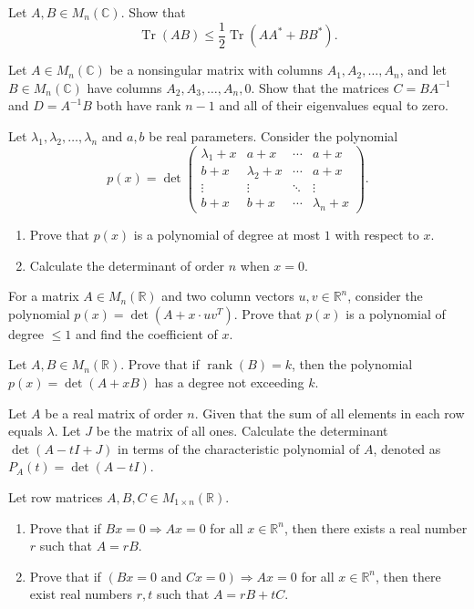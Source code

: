 \documentclass[12pt]{article}
\begin{document}
\begin{problems}
\item Let $A, B \in M_n(\mathbb{C})$. Show that
$$\operatorname{Tr}(AB) \le \frac{1}{2}\operatorname{Tr}(AA^* + BB^*).$$

\item Let $A \in M_n(\mathbb{C})$ be a nonsingular matrix with columns $A_1, A_2, \ldots, A_n$, and let $B \in M_n(\mathbb{C})$ have columns $A_2, A_3, \ldots, A_n, 0$. Show that the matrices $C = BA^{-1}$ and $D = A^{-1}B$ both have rank $n-1$ and all of their eigenvalues equal to zero.

\item Let $\lambda_1,\lambda_2,\dots,\lambda_n$ and $a,b$ be real parameters. Consider the polynomial
\[
p(x) = \det\begin{pmatrix}
\lambda_1+x & a+x & \cdots & a+x\\
b+x & \lambda_2+x & \cdots & a+x\\
\vdots & \vdots & \ddots & \vdots\\
b+x & b+x & \cdots & \lambda_n+x
\end{pmatrix}.
\]
\begin{enumerate}[label=(\alph*)]
\item Prove that $p(x)$ is a polynomial of degree at most $1$ with respect to $x$.
\item Calculate the determinant of order $n$ when $x=0$.
\end{enumerate}

\item For a matrix $A\in M_n(\mathbb{R})$ and two column vectors $u,v\in\mathbb{R}^n$, consider the polynomial $p(x)=\det(A+x\cdot uv^T)$. Prove that $p(x)$ is a polynomial of degree $\le 1$ and find the coefficient of $x$.

\item Let $A,B\in M_n(\mathbb{R})$. Prove that if $\operatorname{rank}(B)=k$, then the polynomial $p(x)=\det(A+xB)$ has a degree not exceeding $k$.

\item Let $A$ be a real matrix of order $n$. Given that the sum of all elements in each row equals $\lambda$. Let $J$ be the matrix of all ones. Calculate the determinant $\det(A-tI+J)$ in terms of the characteristic polynomial of $A$, denoted as $P_A(t)=\det(A-tI)$.

\item Let row matrices $A,B,C\in M_{1\times n}(\mathbb{R})$.
\begin{enumerate}[label=(\alph*)]
\item Prove that if $Bx=0\Rightarrow Ax=0$ for all $x\in\mathbb{R}^n$, then there exists a real number $r$ such that $A=rB$.
\item Prove that if $(Bx=0 \text{ and } Cx=0)\Rightarrow Ax=0$ for all $x\in\mathbb{R}^n$, then there exist real numbers $r,t$ such that $A=rB+tC$.
\end{enumerate}


\end{problems}
\end{document}

